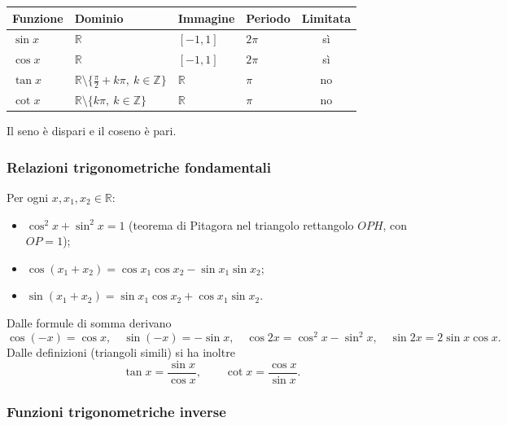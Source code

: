 \documentclass[11pt,a4paper]{article}
\begin{document}
\begin{center}
\renewcommand{\arraystretch}{1.3}
\begin{tabular}{@{}llllc@{}}
\toprule
Funzione & Dominio & Immagine & Periodo & Limitata \\
\midrule
$\sin x$ & $\mathbb{R}$ & $[-1, 1]$ & $2\pi$ & sì \\
$\cos x$ & $\mathbb{R}$ & $[-1, 1]$ & $2\pi$ & sì \\
$\tan x$ & $\mathbb{R} \setminus \{\frac{\pi}{2} + k\pi,\ k \in \mathbb{Z}\}$ & $\mathbb{R}$ & $\pi$ & no \\
$\cot x$ & $\mathbb{R} \setminus \{k\pi,\ k \in \mathbb{Z}\}$ & $\mathbb{R}$ & $\pi$ & no \\
\bottomrule
\end{tabular}
\end{center}

Il seno è dispari e il coseno è pari.

\subsubsection{Relazioni trigonometriche fondamentali}

Per ogni $x, x_1, x_2 \in \mathbb{R}$:
\begin{itemize}
    \item $\cos^2 x + \sin^2 x = 1$ (teorema di Pitagora nel triangolo rettangolo $OPH$, con $OP = 1$);
    \item $\cos(x_1 + x_2) = \cos x_1 \cos x_2 - \sin x_1 \sin x_2$;
    \item $\sin(x_1 + x_2) = \sin x_1 \cos x_2 + \cos x_1 \sin x_2$.
\end{itemize}
Dalle formule di somma derivano
\[
\cos(-x) = \cos x, \quad \sin(-x) = -\sin x, \quad \cos 2x = \cos^2 x - \sin^2 x, \quad \sin 2x = 2\sin x \cos x.
\]
Dalle definizioni (triangoli simili) si ha inoltre
\[
\tan x = \frac{\sin x}{\cos x}, \qquad \cot x = \frac{\cos x}{\sin x}.
\]

\subsubsection{Funzioni trigonometriche inverse}
\end{document}
